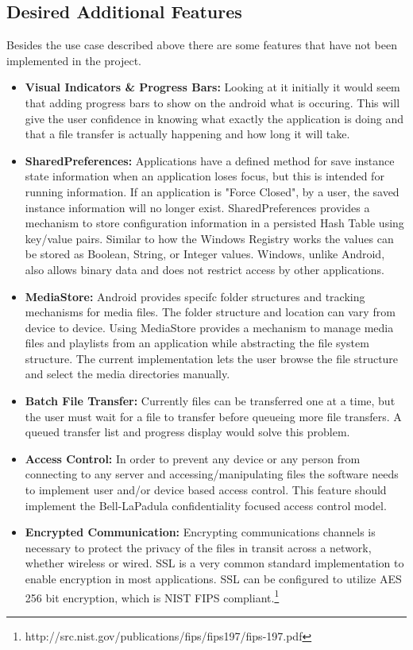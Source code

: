 \documentclass[12pt]{article}
\begin{document}
\subsection{Desired Additional Features}
Besides the use case described above there are some features that have not been implemented in the project.
\begin{itemize}
\item \textbf{Visual Indicators \& Progress Bars:} Looking at it initially it would seem that adding progress bars to show on the android what is occuring. This will give the user confidence in knowing what exactly the application is doing and that a file transfer is actually happening and how long it will take.
\item \textbf{SharedPreferences:} Applications have a defined method for save instance state information when an application loses focus, but this is intended for running information. If an application is "Force Closed", by a user, the saved instance information will no longer exist. SharedPreferences provides a mechanism to store configuration information in a persisted Hash Table using key/value pairs. Similar to how the Windows Registry works the values can be stored as Boolean, String, or Integer values. Windows, unlike Android, also allows binary data and does not restrict access by other applications. 
\item \textbf{MediaStore:} Android provides specifc folder structures and tracking mechanisms for media files. The folder structure and location can vary from device to device. Using MediaStore provides a mechanism to manage media files and playlists from an application while abstracting the file system structure. The current implementation lets the user browse the file structure and select the media directories manually.

\item \textbf{Batch File Transfer:} Currently files can be transferred one at a time, but the user must wait for a file to transfer before queueing more file transfers. A queued transfer list and progress display would solve this problem.
\item \textbf{Access Control:} In order to prevent any device or any person from connecting to any server and accessing/manipulating files the software needs to implement user and/or device based access control. This feature should implement the Bell-LaPadula confidentiality focused access control model.
\item \textbf{Encrypted Communication:} Encrypting communications channels is necessary to protect the privacy of the files in transit across a network, whether wireless or wired. SSL is a very common standard implementation to enable encryption in most applications. SSL can be configured to utilize AES 256 bit encryption, which is NIST FIPS compliant.\footnote{http://src.nist.gov/publications/fips/fips197/fips-197.pdf}


\end{itemize}
\end{document}
